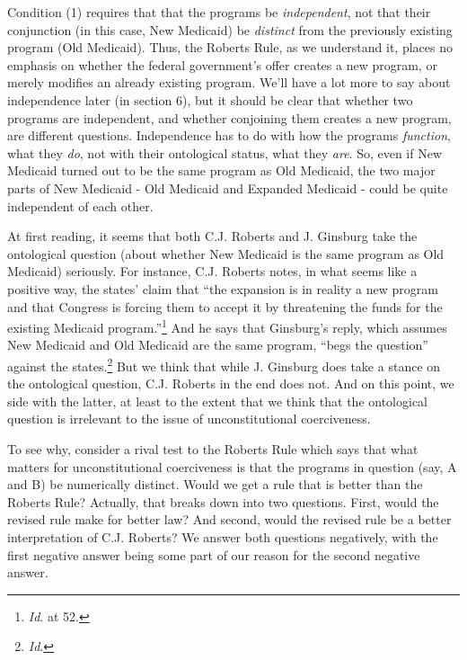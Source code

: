\documentclass[
  10pt,
  letterpaper,
  DIV=11,
  numbers=noendperiod,
  twoside]{scrartcl}
\begin{document}
Condition (1) requires that that the programs be \emph{independent}, not
that their conjunction (in this case, New Medicaid) be \emph{distinct}
from the previously existing program (Old Medicaid). Thus, the Roberts
Rule, as we understand it, places no emphasis on whether the federal
government's offer creates a new program, or merely modifies an already
existing program. We'll have a lot more to say about independence later
(in section 6), but it should be clear that whether two programs are
independent, and whether conjoining them creates a new program, are
different questions. Independence has to do with how the programs
\emph{function}, what they \emph{do}, not with their ontological status,
what they \emph{are}. So, even if New Medicaid turned out to be the same
program as Old Medicaid, the two major parts of New Medicaid - Old
Medicaid and Expanded Medicaid - could be quite independent of each
other.

At first reading, it seems that both C.J. Roberts and J. Ginsburg take
the ontological question (about whether New Medicaid is the same program
as Old Medicaid) seriously. For instance, C.J. Roberts notes, in what
seems like a positive way, the states' claim that ``the expansion is in
reality a new program and that Congress is forcing them to accept it by
threatening the funds for the existing Medicaid program.''\footnote{\emph{Id}.
  at 52.} And he says that Ginsburg's reply, which assumes New Medicaid
and Old Medicaid are the same program, ``begs the question'' against the
states.\footnote{\emph{Id}.} But we think that while J. Ginsburg does
take a stance on the ontological question, C.J. Roberts in the end does
not. And on this point, we side with the latter, at least to the extent
that we think that the ontological question is irrelevant to the issue
of unconstitutional coerciveness.

To see why, consider a rival test to the Roberts Rule which says that
what matters for unconstitutional coerciveness is that the programs in
question (say, A and B) be numerically distinct. Would we get a rule
that is better than the Roberts Rule? Actually, that breaks down into
two questions. First, would the revised rule make for better law? And
second, would the revised rule be a better interpretation of C.J.
Roberts? We answer both questions negatively, with the first negative
answer being some part of our reason for the second negative answer.
\end{document}
